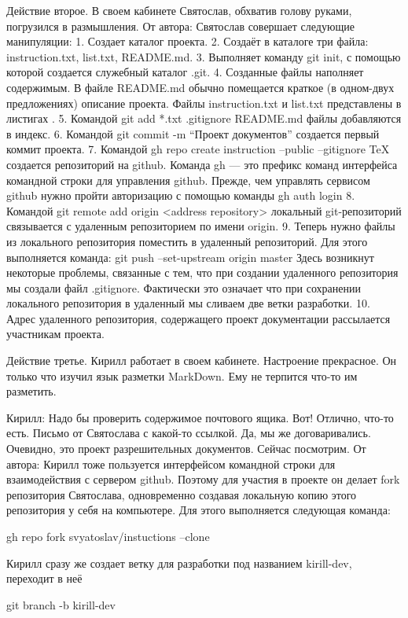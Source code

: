Действие второе.
В своем кабинете Святослав, обхватив голову руками, погрузился в размышления.
От автора:
Святослав совершает следующие манипуляции:
1. Создает каталог проекта.
2. Создаёт в каталоге три файла: instruction.txt, list.txt, README.md.
3. Выполняет команду git init, с помощью которой создается служебный каталог .git.
4. Созданные файлы наполняет содержимым. В файле README.md обычно помещается краткое (в одном-двух
предложениях) описание проекта. Файлы instruction.txt и list.txt представлены в листигах .
5. Командой git add *.txt .gitignore README.md файлы добавляются в индекс.
6. Командой git commit -m ``Проект документов'' создается первый коммит проекта.
7. Командой
 gh repo create instruction --public --gitignore TeX
	создается репозиторий на github.
 Команда gh --- это префикс команд интерфейса командной строки для управления
github. Прежде, чем управлять сервисом github нужно пройти авторизацию с помощью команды
  gh auth login
8. Командой 
	git remote add origin <address repository>
локальный git-репозиторий связывается с удаленным репозиторием по имени origin.
9. Теперь нужно файлы из локального репозитория поместить в удаленный репозиторий. Для этого
выполняется команда:
	git push --set-upstream origin master
Здесь возникнут некоторые проблемы, связанные с тем, что при создании 
удаленного репозитория мы создали файл .gitignore. Фактически это означает что 
при сохранении локального репозитория в удаленный мы сливаем две ветки разработки.
10. Адрес удаленного репозитория, содержащего проект документации рассылается участникам
проекта. 

Действие третье.
Кирилл работает в своем кабинете. Настроение прекрасное. Он только что изучил язык разметки
MarkDown. Ему не терпится что-то им разметить. 

Кирилл: Надо бы проверить содержимое почтового ящика. Вот! Отлично, что-то есть. 
Письмо от Святослава с какой-то ссылкой. Да, мы же договаривались. Очевидно, это проект
разрешительных документов. Сейчас посмотрим.
От автора: Кирилл тоже пользуется интерфейсом командной строки для взаимодействия с сервером
github. Поэтому для участия в проекте он делает fork репозитория Святослава, одновременно
создавая локальную копию этого репозитория у себя на компьютере. Для этого выполняется следующая
команда:

gh repo fork svyatoslav/instuctions --clone

Кирилл сразу же создает ветку для разработки под названием kirill-dev, переходит в  неё 

git branch -b kirill-dev

